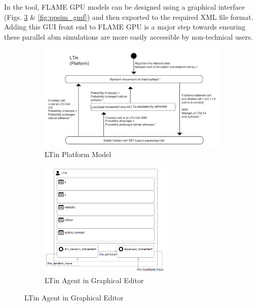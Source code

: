 \documentclass{UoYCSproject}
\begin{document}
In the tool, \gls{FLAME GPU} models can be designed using a graphical interface (Figs. \ref{fig:ltin_gmf} \& \ref{fig:ppsim_gmf}) and then exported to the required XML file format.
Adding this GUI front end to \gls{FLAME GPU} is a major step towards ensuring these parallel \gls{abm} simulations are more easily accessible by non-technical users.

\begin{figure}[htp]
\centering

\begin{subfigure}{0.49\textwidth}
\centering
\includegraphics[width=\textwidth]{Appendix/Models/LTin_Cropped}
\caption{LTin Platform Model\cite{kieran_thesis}}
\label{fig:ltin_cropped}
\end{subfigure}
\begin{subfigure}{0.49\textwidth}
\centering
\includegraphics[width=0.7\textwidth]{Appendix/Models/LTin_GMF}
\caption{LTin Agent in Graphical Editor}
\label{fig:ltin_gmf}
\end{subfigure}


\end{figure}
\end{document}
